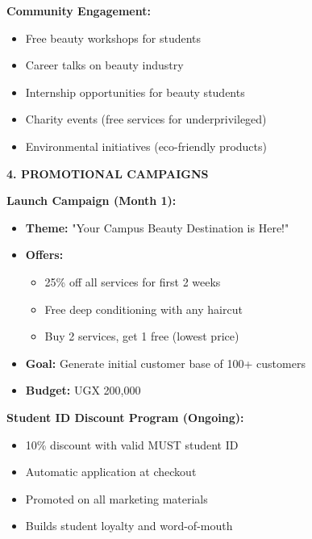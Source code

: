 \documentclass[a4paper,12pt]{article}
\begin{document}
\textbf{Community Engagement:}
\begin{itemize}[leftmargin=2em]
    \item Free beauty workshops for students
    \item Career talks on beauty industry
    \item Internship opportunities for beauty students
    \item Charity events (free services for underprivileged)
    \item Environmental initiatives (eco-friendly products)
\end{itemize}

\vspace{1em}

\textbf{4. PROMOTIONAL CAMPAIGNS}

\textbf{Launch Campaign (Month 1):}
\begin{itemize}[leftmargin=2em]
    \item \textbf{Theme:} "Your Campus Beauty Destination is Here!"
    \item \textbf{Offers:}
    \begin{itemize}
        \item 25\% off all services for first 2 weeks
        \item Free deep conditioning with any haircut
        \item Buy 2 services, get 1 free (lowest price)
    \end{itemize}
    \item \textbf{Goal:} Generate initial customer base of 100+ customers
    \item \textbf{Budget:} UGX 200,000
\end{itemize}

\textbf{Student ID Discount Program (Ongoing):}
\begin{itemize}[leftmargin=2em]
    \item 10\% discount with valid MUST student ID
    \item Automatic application at checkout
    \item Promoted on all marketing materials
    \item Builds student loyalty and word-of-mouth
\end{itemize}
\end{document}
